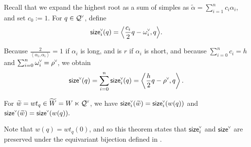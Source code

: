 \documentclass[ALCO,published]{cedram}
\newcommand{\chk}[1]{#1^{\normalfont\smash{\scalebox{.5}[.5]{\rotatebox{90}{\textbf{\textless}}}}}}
\newcommand{\wa}{\widetilde{W}}
\newcommand{\Q}{\mathcal{Q}}
\newcommand{\cw}{\chk{\omega}}
\newcommand{\waf}{\widetilde{w}}
\newcommand{\size}{{\sf size}}
\begin{document}
\begin{defi}
\label{def:sizelattice}
Recall that we expand the highest root as a sum of simples as $\widetilde{\alpha}=\sum_{i=1}^n c_i \alpha_i$, and set $c_0:=1$.  For $q \in \chk{\Q}$, define
\[\chk{\size_i}(q)=\Big\langle \frac{c_i}{2}q-\chk{\omega_i},q\Big\rangle.\]
\end{defi}

Because $\frac{2}{\left\langle \alpha_i, \alpha_i\right\rangle} = 1$ if $\alpha_i$ is long, and is $r$ if $\alpha_i$ is short, and because $\sum_{i=0}^n c_i = h$ and $\sum_{i=0}^n \cw_i = \chk{\rho}$, we obtain 
\[\chk{\size}(q) = \sum_{i=0}^n \chk{\size}_i(q) = \left\langle \frac{h}{2}q - \chk{\rho},q \right\rangle.\]

\begin{theorem}
\label{thm:sizer}
For $\waf = w t_q \in \wa= W \ltimes \chk{\Q}$, we have $\chk{\size}_i(\waf) =\chk{\size_i}(w(q))$ and $\chk{\size}(\waf)=\chk{\size}(w(q)).$
\end{theorem}

Note that $w(q) = wt_q(0)$, and so this theorem states that $\chk{\size}_i$ and $\chk{\size}$ are preserved under the equivariant bijection defined in .
\end{document}
